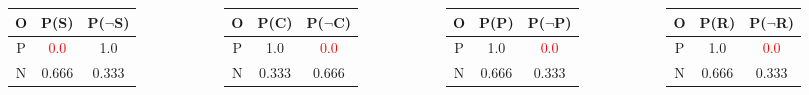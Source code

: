 \documentclass[aspectratio=169, 10pt]{beamer}
\begin{document}
\begin{frame}[t]
    \begin{columns}
        \begin{column}{0.25\textwidth}
            \begin{table}[]
                \small
                \begin{tabular}{ccc}
                O & P(S) & P($\neg$S) \\ \hline
                P & \textcolor{red}{0.0} & 1.0 \\
                N & 0.666 & 0.333 \\
                \end{tabular}
            \end{table}
        \end{column}
        \begin{column}{0.25\textwidth}
            \begin{table}[]
                \small
                \begin{tabular}{ccc}
                O & P(C) & P($\neg$C) \\ \hline
                P & 1.0 & \textcolor{red}{0.0} \\
                N & 0.333 & 0.666 \\
                \end{tabular}
            \end{table}
        \end{column}
        \begin{column}{0.25\textwidth}
            \begin{table}[]
                \small
                \begin{tabular}{ccc}
                O & P(P) & P($\neg$P) \\ \hline
                P & 1.0 & \textcolor{red}{0.0} \\
                N & 0.666 & 0.333 \\
                \end{tabular}
            \end{table}
        \end{column}
        \begin{column}{0.25\textwidth}
            \begin{table}[]
                \small
                \begin{tabular}{ccc}
                O & P(R) & P($\neg$R) \\ \hline
                P & 1.0 & \textcolor{red}{0.0} \\
                N & 0.666 & 0.333 \\
                \end{tabular}
            \end{table}
        \end{column}
    \end{columns}


\end{frame}
\end{document}

